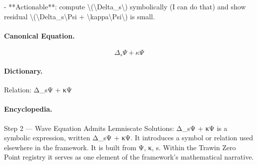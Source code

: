 - **Actionable**: compute \textbackslash{}(\textbackslash{}Delta\_s\textbackslash{}) symbolically (I can do that) and show residual \textbackslash{}(\textbackslash{}Delta\_s\textbackslash{}Psi + \textbackslash{}kappa\textbackslash{}Psi\textbackslash{}) is small.

\paragraph{Canonical Equation.}
\[
\Delta_s\Psi + \kappa\Psi
\]

\paragraph{Dictionary.}
Relation: Δ\_sΨ + κΨ

\paragraph{Encyclopedia.}
Step 2 — Wave Equation Admits Lemniscate Solutions: Δ\_sΨ + κΨ is a symbolic expression, written Δ\_sΨ + κΨ. It introduces a symbol or relation used elsewhere in the framework. It is built from Ψ, κ, s. Within the Trawin Zero Point registry it serves as one element of the framework's mathematical narrative.
